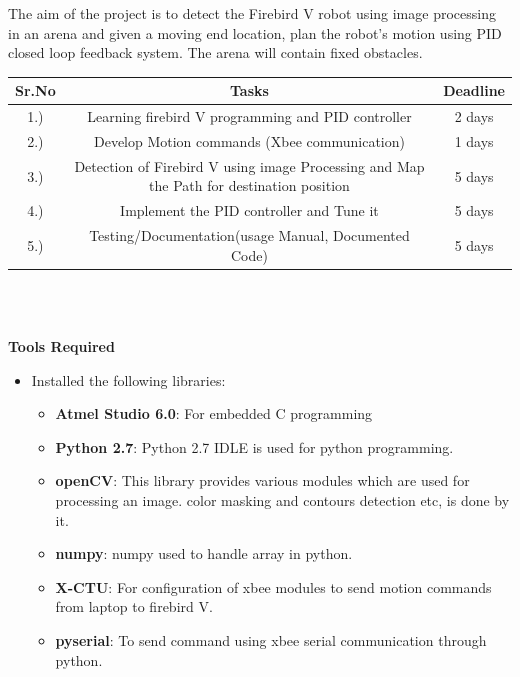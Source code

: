 \documentclass[report]{res}
\begin{document}
	The aim of the project is to detect the Firebird V robot using image processing in an arena and given a moving end location, plan the robot's motion using PID closed loop feedback system. The arena will contain fixed obstacles. \\
	
	\begin{tabular}{|c|c|c|}
	
		\hline
		\bf Sr.No & \bf Tasks & \bf Deadline \\ 
		\hline
		1.) & Learning firebird V programming and PID controller & 2 days \\
		\hline
		2.) & Develop Motion commands (Xbee communication) & 1 days \\
		\hline
		3.) & Detection of Firebird V using image Processing and Map the Path for destination position & 5 days\\
		\hline
		4.) & Implement the PID controller and Tune it & 5 days
		\\ \hline
		5.) & Testing/Documentation(usage Manual, Documented Code) & 5 days
		\\ \hline
		
	\end{tabular} \\ \\
	
	\pagebreak


	\begin{center}
		\textbf{\huge Tools Required} \\
	\end{center}

	\begin{itemize}
		\item Installed the following libraries:

		\begin{itemize}

			\item \textbf{Atmel Studio 6.0}: For embedded C programming 
			\item \textbf{Python 2.7}: Python 2.7 IDLE is used for python programming. 
			\item \textbf{openCV}: This library provides various modules which are used for processing an image. color masking and contours detection etc, is done by it.
			\item \textbf{numpy}: numpy used to handle array in python.
			\item \textbf{X-CTU}: For configuration of xbee modules to send motion commands from laptop to firebird V.
			\item \textbf{pyserial}: To send command using xbee serial communication through python.
			
		\end{itemize}	
		
	\end{itemize}
	
\end{document}
